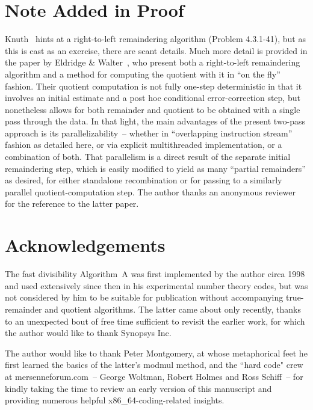 \documentclass{article}
\begin{document}
\section{Note Added in Proof}

Knuth~\cite{Knuth} hints at a right-to-left remaindering algorithm (Problem 4.3.1-41), but as this is cast as an exercise, there are scant details. Much more detail is provided in the paper by Eldridge \& Walter~\cite{EldWalt93}, who present both a right-to-left remaindering algorithm and a method for computing the quotient with it in ``on the fly'' fashion. Their quotient computation is not fully one-step deterministic in that it involves an initial estimate and a post hoc conditional error-correction step, but nonetheless allows for both remainder and quotient to be obtained with a single pass through the data. In that light, the main advantages of the present two-pass approach is its parallelizability~-- whether in ``overlapping instruction stream'' fashion as detailed here, or via explicit multithreaded implementation, or a combination of both. That parallelism is a direct result of the separate initial remaindering step, which is easily modified to yield as many ``partial remainders'' as desired, for either standalone recombination or for passing to a similarly parallel quotient-computation step. The author thanks an anonymous reviewer for the reference to the latter paper.



\section{Acknowledgements}

The fast divisibility Algorithm~A was first implemented by the author circa 1998 and used extensively since then in his experimental number theory codes, but was not considered by him to be suitable for publication without accompanying true-remainder and quotient algorithms. The latter came about only recently, thanks to an unexpected bout of free time sufficient to revisit the earlier work, for which the author would like to thank Synopsys Inc.

The author would like to thank Peter Montgomery, at whose metaphorical feet he first learned the basics of the latter's modmul method, and the ``hard code" crew at mersenneforum.com~-- George Woltman, Robert Holmes and Ross Schiff~-- for kindly taking the time to review an early version of this manuscript and providing numerous helpful x86\_64-coding-related insights.



\end{document}
